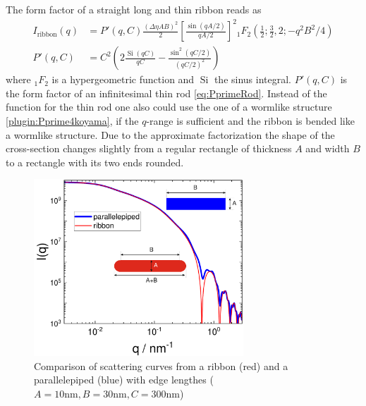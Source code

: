 The form factor of a straight long and thin ribbon reads as
\begin{align}\label{eq:ribbon_mono}
  I_\mathrm{ribbon}(q) &= P'(q,C) \frac{(\Delta\eta AB)^2}{2} \left[\frac{\sin(qA/2)}{qA/2}\right]^2 {}_1F_2\left(\frac12;\frac32,2;-q^2B^2/4\right) \\
  P'(q,C) &= C^2 \left(2 \frac{\operatorname{Si}(qC)}{qC}-\frac{\sin^2(qC/2)}{(qC/2)^2}\right)
\end{align}
where $_1F_2$ is a hypergeometric function and $\operatorname{Si}$ the sinus integral. $P'(q,C)$ is the form factor of an infinitesimal thin rod \ref{eq:PprimeRod}. Instead of the function for the thin rod one also could use the one of a wormlike structure \ref{plugin:Pprime4koyama}, if the $q$-range is sufficient and the ribbon is bended like a wormlike structure. Due to the approximate factorization \cite{Su2014} the shape of the cross-section changes slightly from a regular rectangle of thickness $A$ and width $B$ to a rectangle with its two ends rounded.
\begin{figure}[htb]
\begin{center}
\includegraphics[width=0.7\textwidth]{../images/form_factor/anisotropic/ribbon_monoIQ.pdf}
\end{center}
\caption{Comparison of scattering curves from a ribbon (red) and a parallelepiped (blue) with edge lengthes ($A=10\mathrm{nm}, B=30\mathrm{nm}, C=300\mathrm{nm}$)}
\label{fig:ribbon_monoIQ}
\end{figure}

